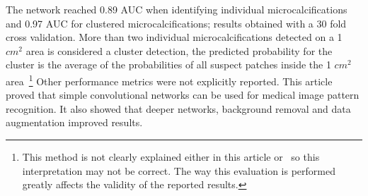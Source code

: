 The network reached 0.89 AUC when identifying individual microcalcifications and 0.97 AUC for clustered microcalcifications; results obtained with a 30 fold cross validation. More than two individual microcalcifications detected on a 1 $cm^2$ area is considered a cluster detection, the predicted probability for the cluster is the average of the probabilities of all suspect patches inside the 1 $cm^2$ area~\footnote{This method is not clearly explained either in this article or~\cite{Lo1998} so this interpretation may not be correct. The way this evaluation is performed greatly affects the validity of the reported results.} Other performance metrics were not explicitly reported.
This article proved that simple convolutional networks can be used for medical image pattern recognition. It also showed that deeper networks, background removal and data augmentation improved results.









